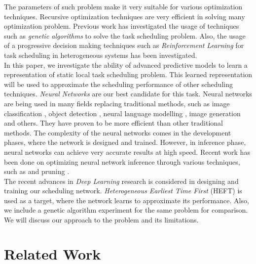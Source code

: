 \documentclass[twocolumn,11pt]{IEEEtran}
\begin{document}
The parameters of such problem make it very suitable for various optimization techniques. Recursive optimization techniques are very efficient in solving many optimization problem. Previous work has investigated the usage of techniques such as \emph{genetic algorithms} \cite{article2} to solve the task scheduling problem. Also, the usage of a progressive decision making techniques such as \emph{Reinforcement Learning} \cite{ORHEAN2018292} for task scheduling in heterogeneous systems has been investigated. \\

In this paper, we investigate the ability of advanced predictive models to learn a representation of static local task scheduling problem. This learned representation will be used to approximate the scheduling performance of other scheduling techniques. \emph{Neural Networks} are our best candidate for this task. Neural networks are being used in many fields replacing traditional methods, such as image classification \cite{10.1145/3065386}, object detection \cite{ren2015faster}, neural language modelling \cite{ren2015faster}, image generation \cite{karras2019analyzing} and others. They have proven to be more efficient than other traditional methods. The complexity of the neural networks comes in the development phases, where the network is designed and trained. However, in inference phase, neural networks can achieve very accurate results at high speed. Recent work has been done on optimizing neural network inference through various techniques, such as  \cite{choukroun2019lowbit} and pruning \cite{yeom2019pruning}. \\

The recent advances in \emph{Deep Learning} research is considered in designing and training our scheduling network. \emph{Heterogeneous Earliest Time First} (HEFT)\cite{993206} is used as a target, where the network learns to approximate its performance. Also, we include a genetic algorithm experiment for the same problem for comparison. We will discuss our approach to the problem and its limitations.

\section{Related Work}
\end{document}
